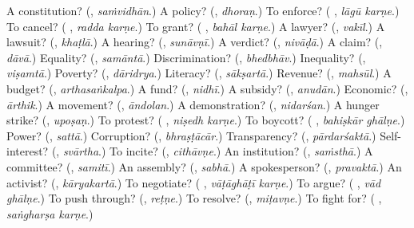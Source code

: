 \begin{tcolorbox}[breakable,colback=teal!4,colframe=teal!35!black,title={Before you move on}]
A constitution? (\textbf{}, \emph{saṁvidhān}.) A policy? (\textbf{}, \emph{dhoraṇ}.) To enforce? (\textbf{ }, \emph{lāgū karṇe}.) To cancel? (\textbf{ }, \emph{radda karṇe}.) To grant? (\textbf{ }, \emph{bahāl karṇe}.) A lawyer? (\textbf{}, \emph{vakīl}.) A lawsuit? (\textbf{}, \emph{khaṭlā}.) A hearing? (\textbf{}, \emph{sunāvṇī}.) A verdict? (\textbf{}, \emph{nivāḍā}.) A claim? (\textbf{}, \emph{dāvā}.) Equality? (\textbf{}, \emph{samāntā}.) Discrimination? (\textbf{}, \emph{bhedbhāv}.) Inequality? (\textbf{}, \emph{viṣamtā}.) Poverty? (\textbf{}, \emph{dāridrya}.) Literacy? (\textbf{}, \emph{sākṣartā}.) Revenue? (\textbf{}, \emph{mahsūl}.) A budget? (\textbf{}, \emph{arthasaṅkalpa}.) A fund? (\textbf{}, \emph{nidhī}.) A subsidy? (\textbf{}, \emph{anudān}.) Economic? (\textbf{}, \emph{ārthik}.) A movement? (\textbf{}, \emph{āndolan}.) A demonstration? (\textbf{}, \emph{nidarśan}.) A hunger strike? (\textbf{}, \emph{upoṣaṇ}.) To protest? (\textbf{ }, \emph{niṣedh karṇe}.) To boycott? (\textbf{ }, \emph{bahiṣkār ghālṇe}.) Power? (\textbf{}, \emph{sattā}.) Corruption? (\textbf{}, \emph{bhraṣṭācār}.) Transparency? (\textbf{}, \emph{pārdarśaktā}.) Self-interest? (\textbf{}, \emph{svārtha}.) To incite? (\textbf{}, \emph{cithāvṇe}.) An institution? (\textbf{}, \emph{saṁsthā}.) A committee? (\textbf{}, \emph{samitī}.) An assembly? (\textbf{}, \emph{sabhā}.) A spokesperson? (\textbf{}, \emph{pravaktā}.) An activist? (\textbf{}, \emph{kāryakartā}.) To negotiate? (\textbf{ }, \emph{vāṭāghāṭī karṇe}.) To argue? (\textbf{ }, \emph{vād ghālṇe}.) To push through? (\textbf{}, \emph{reṭṇe}.) To resolve? (\textbf{}, \emph{miṭavṇe}.) To fight for? (\textbf{ }, \emph{saṅgharṣa karṇe}.)
\end{tcolorbox}
